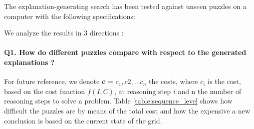 The explanation-generating search has been tested against unseen puzzles on a computer with the following specifications:

\begin{table}
	\centering
\caption{Computer system specifications}
\label{table:system_specifications}
\end{table}

We analyze the results in 3 directions :

\paragraph{Q1. How do different puzzles compare with respect to the generated explanations ?} For future reference, we denote \textbf{c} = $c_1, c2, ...c_n$ the costs, where $c_i$ is the cost, based on the cost function $f(I, C)$, at reasoning step $i$ and n the number of reasoning steps to solve a problem. Table \ref{table:sequence_leve} shows how difficult the puzzles are by means of the total cost and how the expensive a new conclusion is based on the current state of the grid.

\begin{table}
	\centering
\caption{Puzzle explanation cost based on the cost function $f(I, C)$ and statistics on puzzle constraints}
\label{table:sequence_leve}
\end{table}

